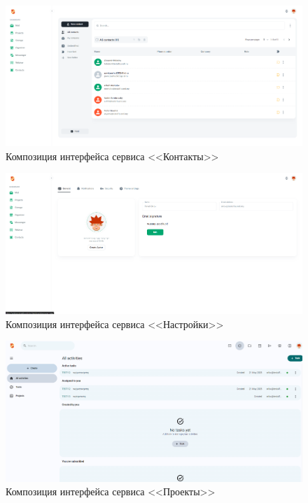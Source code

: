 \begin{figure}[ht]
	\centering
	\includegraphics[width=1\linewidth]{images/контакты}
	\caption{Композиция интерфейса сервиса <<Контакты>>}
	\label{templ:image5}
\end{figure}

\begin{figure}[ht]
	\centering
	\includegraphics[width=1\linewidth]{images/настройки}
	\caption{Композиция интерфейса сервиса <<Настройки>>}
	\label{templ:image6}
\end{figure}

\begin{figure}[ht]
	\centering
	\includegraphics[width=1\linewidth]{images/проекты}
	\caption{Композиция интерфейса сервиса <<Проекты>>}
	\label{templ:image7}
\end{figure}


